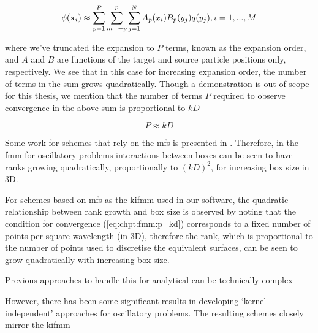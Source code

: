 \begin{equation}
    \phi(\mathbf{x}_i) \approx \sum_{p=1}^P \sum_{m=-p}^p \sum_{j=1}^N A_p(x_i) B_p(y_j) q(y_j), i=1,...,M
\end{equation}

where we've truncated the expansion to $P$ terms, known as the expansion order, and $A$ and $B$ are functions of the target and source particle positions only, respectively. We see that in this case for increasing expansion order, the number of terms in the sum grows quadratically. Though a demonstration is out of scope for this thesis, we mention that the number of terms $P$ required to observe convergence in the above sum is proportional to $kD$

\begin{equation}
    P \approx kD
    \label{eq:chpt:fmm:p_kd}
\end{equation}

Some work for schemes that rely on the \acrshort{mfs} is presented in \cite{barnett2008stability}. Therefore, in the \acrshort{fmm} for oscillatory problems interactions between boxes can be seen to have ranks growing quadratically, proportionally to $(kD)^2$, for increasing box size in 3D.

For schemes based on \acrshort{mfs} as the \acrshort{kifmm} used in our software, the quadratic relationship between rank growth and box size is observed by noting that the condition for convergence (\ref{eq:chpt:fmm:p_kd}) corresponds to a fixed number of points per square wavelength (in 3D), therefore the rank, which is proportional to the number of points used to discretise the equivalent surfaces, can be seen to grow quadratically with increasing box size.

Previous approaches to handle this for analytical  can be technically complex

However, there has been some significant results in developing `kernel independent' approaches for oscillatory problems. The resulting schemes closely mirror the \acrshort{kifmm}






